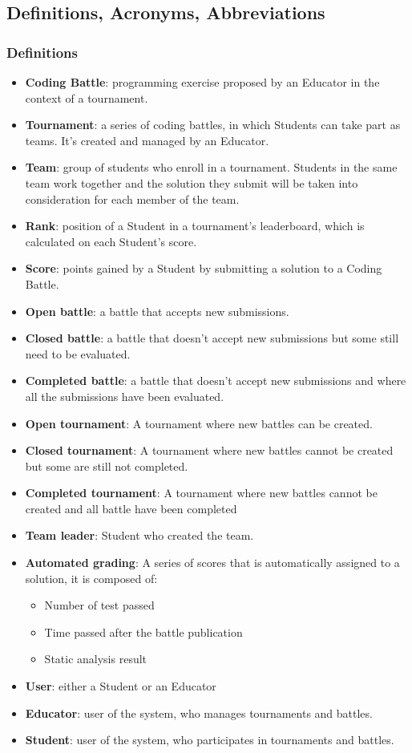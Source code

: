 \documentclass{article}
\begin{document}
\subsection{Definitions, Acronyms, Abbreviations}
\subsubsection{Definitions}
\begin{itemize}
\item \textbf{Coding Battle}: programming exercise proposed by an Educator in the context of a tournament.
\item \textbf{Tournament}: a series of coding battles, in which Students can take part as teams. It’s created and managed by an Educator.
\item \textbf{Team}: group of students who enroll in a tournament. Students in the same team work together and the solution they submit will be taken into consideration for each member of the team.
\item \textbf{Rank}: position of a Student in a tournament’s leaderboard, which is calculated on each Student’s score.
\item \textbf{Score}: points gained by a Student by submitting a solution to a Coding Battle.
\item \textbf{Open battle}: a battle that accepts new submissions.
\item \textbf{Closed battle}: a battle that doesn’t accept new submissions but some still need to be evaluated.
\item \textbf{Completed battle}: a battle that doesn’t accept new submissions and where all the submissions have been evaluated.
\item \textbf{Open tournament}: A tournament where new battles can be created.
\item \textbf{Closed tournament}: A tournament where new battles cannot be created but some are still not completed.
\item \textbf{Completed tournament}: A tournament where new battles cannot be created and all battle have been completed
\item \textbf{Team leader}: Student who created the team.
\item \textbf{Automated grading}: A series of scores that is automatically assigned to a solution, it is composed of:
\begin{itemize}
\item Number of test passed
\item Time passed after the battle publication
\item Static analysis result
\end{itemize}
\item \textbf{User}: either a Student or an Educator
\item \textbf{Educator}: user of the system, who manages tournaments and battles.
\item \textbf{Student}: user of the system, who participates in tournaments and battles.
\end{itemize}
\end{document}
